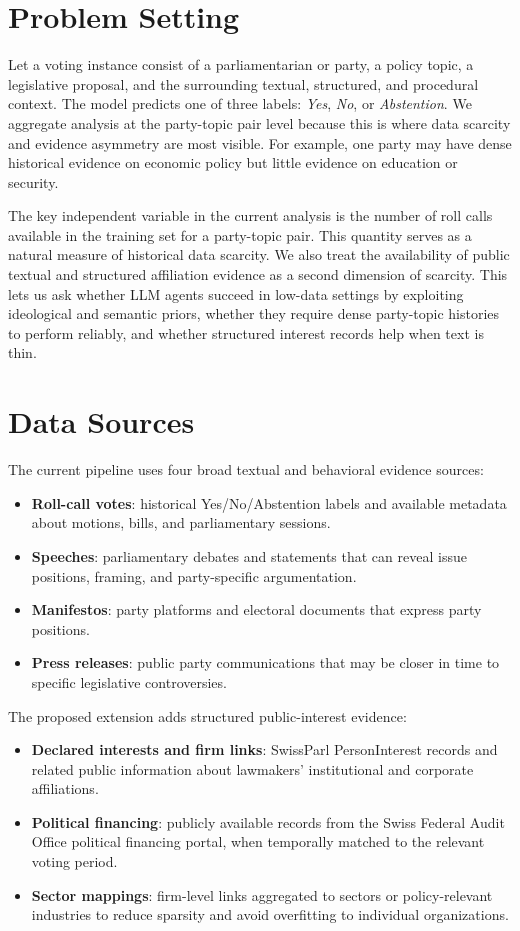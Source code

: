 \documentclass[letterpaper]{article}
\begin{document}
\section{Problem Setting}

Let a voting instance consist of a parliamentarian or party, a policy topic, a legislative proposal, and the surrounding textual, structured, and procedural context. The model predicts one of three labels: \emph{Yes}, \emph{No}, or \emph{Abstention}. We aggregate analysis at the party-topic pair level because this is where data scarcity and evidence asymmetry are most visible. For example, one party may have dense historical evidence on economic policy but little evidence on education or security.

The key independent variable in the current analysis is the number of roll calls available in the training set for a party-topic pair. This quantity serves as a natural measure of historical data scarcity. We also treat the availability of public textual and structured affiliation evidence as a second dimension of scarcity. This lets us ask whether LLM agents succeed in low-data settings by exploiting ideological and semantic priors, whether they require dense party-topic histories to perform reliably, and whether structured interest records help when text is thin.

\section{Data Sources}

The current pipeline uses four broad textual and behavioral evidence sources:
\begin{itemize}
    \item \textbf{Roll-call votes}: historical Yes/No/Abstention labels and available metadata about motions, bills, and parliamentary sessions.
    \item \textbf{Speeches}: parliamentary debates and statements that can reveal issue positions, framing, and party-specific argumentation.
    \item \textbf{Manifestos}: party platforms and electoral documents that express party positions.
    \item \textbf{Press releases}: public party communications that may be closer in time to specific legislative controversies.
\end{itemize}

The proposed extension adds structured public-interest evidence:
\begin{itemize}
    \item \textbf{Declared interests and firm links}: SwissParl PersonInterest records and related public information about lawmakers' institutional and corporate affiliations.
    \item \textbf{Political financing}: publicly available records from the Swiss Federal Audit Office political financing portal, when temporally matched to the relevant voting period.
    \item \textbf{Sector mappings}: firm-level links aggregated to sectors or policy-relevant industries to reduce sparsity and avoid overfitting to individual organizations.
\end{itemize}
\end{document}
